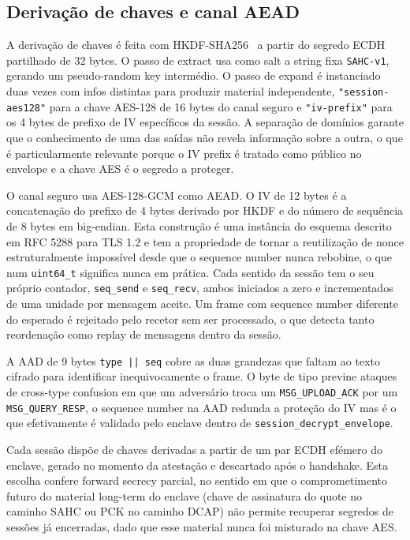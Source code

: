 \subsection{Derivação de chaves e canal AEAD}

A derivação de chaves é feita com HKDF-SHA256~\cite{krawczyk2010hkdf} a partir do segredo ECDH partilhado de 32 bytes. O passo de extract usa como salt a string fixa \texttt{SAHC-v1}, gerando um pseudo-random key intermédio. O passo de expand é instanciado duas vezes com infos distintas para produzir material independente, \texttt{"session-aes128"} para a chave AES-128 de 16 bytes do canal seguro e \texttt{"iv-prefix"} para os 4 bytes de prefixo de IV específicos da sessão. A separação de domínios garante que o conhecimento de uma das saídas não revela informação sobre a outra, o que é particularmente relevante porque o IV prefix é tratado como público no envelope e a chave AES é o segredo a proteger.

O canal seguro usa AES-128-GCM como AEAD. O IV de 12 bytes é a concatenação do prefixo de 4 bytes derivado por HKDF e do número de sequência de 8 bytes em big-endian. Esta construção é uma instância do esquema descrito em RFC 5288 para TLS 1.2 e tem a propriedade de tornar a reutilização de nonce estruturalmente impossível desde que o sequence number nunca rebobine, o que num \texttt{uint64\_t} significa nunca em prática. Cada sentido da sessão tem o seu próprio contador, \texttt{seq\_send} e \texttt{seq\_recv}, ambos iniciados a zero e incrementados de uma unidade por mensagem aceite. Um frame com sequence number diferente do esperado é rejeitado pelo recetor sem ser processado, o que detecta tanto reordenação como replay de mensagens dentro da sessão.

A AAD de 9 bytes \texttt{type || seq} cobre as duas grandezas que faltam ao texto cifrado para identificar inequivocamente o frame. O byte de tipo previne ataques de cross-type confusion em que um adversário troca um \texttt{MSG\_UPLOAD\_ACK} por um \texttt{MSG\_QUERY\_RESP}, o sequence number na AAD redunda a proteção do IV mas é o que efetivamente é validado pelo enclave dentro de \texttt{session\_decrypt\_envelope}.

Cada sessão dispõe de chaves derivadas a partir de um par ECDH efémero do enclave, gerado no momento da atestação e descartado após o handshake. Esta escolha confere forward secrecy parcial, no sentido em que o comprometimento futuro do material long-term do enclave (chave de assinatura do quote no caminho SAHC ou PCK no caminho DCAP) não permite recuperar segredos de sessões já encerradas, dado que esse material nunca foi misturado na chave AES.

